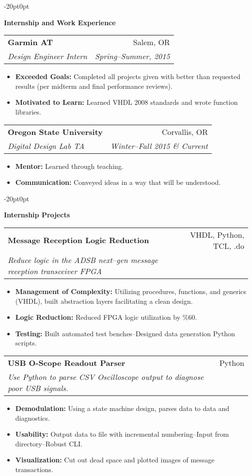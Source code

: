 \documentclass[letterpaper,10pt]{article}
\makeatletter
\newenvironment{smitemize}{
  \vspace{-3pt}
  \begin{itemize}
    \setlength{\itemsep}{0pt}
    \setlength{\parskip}{0pt}
    \setlength{\parsep}{0pt}
  }
  {\end{itemize}}
\newcommand{\resheading}[1]{
  \vspace{-5pt}
  \begin{adjustwidth}{-20pt}{0pt} 
    \begin{tcolorbox}[width=7.2in,
                      frame hidden,
                      colback=black!30,
                      enhanced,
                      top=0pt,
                      bottom=0pt,
                      height=16pt
                      ]
        \bf #1
    \end{tcolorbox}
  \end{adjustwidth}
  \vspace{-5pt}
  }
\newcommand{\ressubheading}[4]{
  \begin{tabular*}{6.5in}{l@{\cftdotfill{\cftsecdotsep}\extracolsep{\fill}}r}
    \textbf{#1} &         #2 \\
    \textit{#3} & \textit{#4} \\
  \end{tabular*}
  }
\makeatother
\begin{document}
\resheading{Internship and Work Experience}

\ressubheading{Garmin AT}{Salem, OR}{Design Engineer Intern}{Spring--Summer, 2015}
\begin{smitemize}
  \item{{\bf Exceeded Goals:} Completed all projects given with better than requested results (per midterm and final performance reviews). }
  \item{{\bf Motivated to Learn:} Learned VHDL 2008 standards and wrote function libraries. }
\end{smitemize}

\ressubheading{Oregon State University}{Corvallis, OR}{Digital Design Lab TA}{Winter--Fall 2015 \& Current}
\begin{smitemize}
  \item{{\bf Mentor:} Learned through teaching.}
  \item{{\bf Communication:} Conveyed ideas in a way that will be understood.}
\end{smitemize}


\resheading{Internship Projects}


\ressubheading{Message Reception Logic Reduction}
              {VHDL, Python, TCL, .do} 
              {Reduce logic in the ADSB next--gen message reception transceiver FPGA}
              {}
\begin{smitemize}
  \item {\bf Management of Complexity:} Utilizing procedures, functions, and generics (VHDL), built abstraction layers facilitating a clean design. 
  \item {\bf Logic Reduction:} Reduced FPGA logic utilization by $\%60$. 
  \item {\bf Testing:} Built automated test benches--Designed data generation Python scripts. 
\end{smitemize}

\ressubheading{USB O-Scope Readout Parser}
              {Python}
              {Use Python to parse CSV Oscilloscope output to diagnose poor USB signals.}
              {}
\begin{smitemize}
  \item {\bf Demodulation:} Using a state machine design, parses data to data and diagnostics. 
  \item {\bf Usability:} Output data to file with incremental numbering--Input from directory--Robust CLI. 
  \item {\bf Visualization:} Cut out dead space and plotted images of message transactions.
\end{smitemize}
\end{document}
